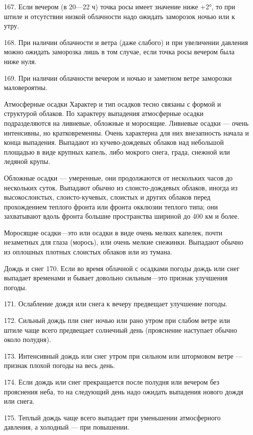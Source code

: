 167. Если вечером (в 20—22 ч) точка росы имеет значение ниже +2°, то при штиле и отсутствии низкой облачности надо ожидать заморозок ночью или к утру.

168. При наличии облачности и ветра (даже слабого) и при увеличении давления можно ожидать заморозка лишь в том случае, если точка росы вечером была ниже нуля.

169. При наличии облачности вечером и ночью и заметном ветре заморозки маловероятны.


Атмосферные осадки
Характер и тип осадков тесно связаны с формой и структурой облаков. По характеру выпадения атмосферные осадки подразделяются на ливневые, обложные и моросящие. Ливневые осадки — очень интенсивны, но кратковременны. Очень характерна для них внезапность начала и конца выпадения. Выпадают из кучево-дождевых облаков над небольшой площадью в виде крупных капель, либо мокрого снега, града, снежной или ледяной крупы.

Обложные осадки — умеренные, они продолжаются от нескольких часов до нескольких суток. Выпадают обычно из слоисто-дождевых облаков, иногда из высокослоистых, слоисто-кучевых, слоистых и других облаков перед прохождением теплого фронта или фронта окклюзии теплого типа; они захватывают вдоль фронта большие пространства шириной до 400 км и более.

Моросящие осадки—это или осадки в виде очень мелких капелек, почти незаметных для глаза (морось), или очень мелкие снежинки. Выпадают обычно из оплошных плотных слоистых облаков или из тумана.

Дождь и снег
170. Если во время облачной с осадками погоды дождь или снег выпадает временами и бывает довольно сильным—это признак улучшения погоды.

171. Ослабление дождя или снега к вечеру предвещает улучшение погоды.

172. Сильный дождь пли снег ночью или рано утром при слабом ветре или штиле чаще всего предвещает солнечный день (прояснение наступает обычно около полудня).

173. Интенсивный дождь или снег утром при сильном или штормовом ветре — признак плохой погоды на весь день.

174. Если дождь или снег прекращается после полудня или вечером без прояснения неба, то на следующий день надо ожидать выпадения нового дождя или снега.

175. Теплый дождь чаще всего выпадает при уменьшении атмосферного давления, а холодный — при повышении.

